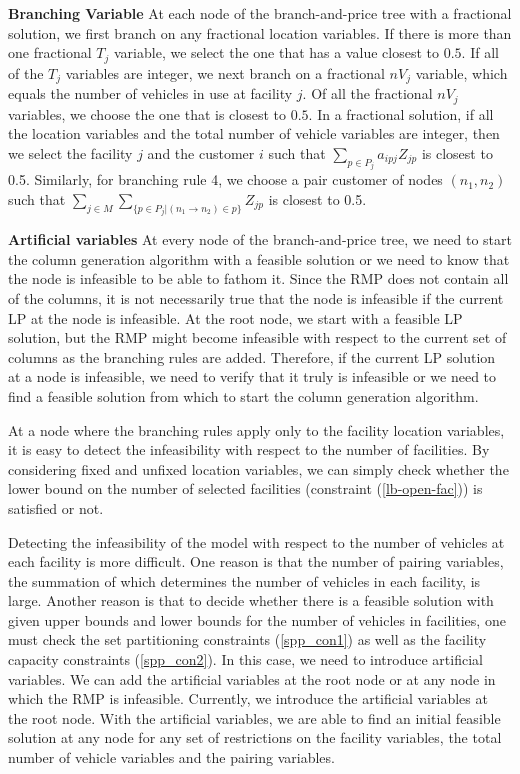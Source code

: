 {\bf Branching Variable} At each node of the branch-and-price tree with 
a fractional solution, we first branch on any fractional location variables. 
If there is more than one fractional $T_j$ variable, we select 
the one that has a value closest to $0.5$. If all of the $T_j$ variables are 
integer, we next branch on a fractional $nV_j$ variable, which equals the number 
of vehicles in use at facility $j$. Of all the fractional $nV_j$ variables, 
we choose the one that is closest to $0.5$. In a fractional solution, if all 
the location variables and the total number of vehicle variables are integer, then we 
select the facility $j$ and the customer $i$ such that 
$\sum_{p \in P_j}a_{ipj}Z_{jp} $  is closest to 0.5. Similarly, for
branching rule 4, we choose a pair customer of nodes $(n_1,n_2)$ such that   
$\sum_{j \in M}\sum_{\{p \in P_j | (n_1\to n_2) \in p\}} Z_{jp}$
is closest to 0.5. 

{\bf Artificial variables} At every node of the branch-and-price tree, we need to start 
the column generation algorithm with a feasible solution or we need to know that the 
node is infeasible to be able to fathom it. Since the RMP does not contain all of the columns,
it is not necessarily true that the node is infeasible if the current LP at the node is 
infeasible. At the root node, we start with a feasible LP solution, but the RMP might become 
infeasible with respect to the current set of columns as the branching rules are added. 
Therefore, if the current LP solution at a node is infeasible, we need to verify that it 
truly is infeasible or we need to find a feasible solution from which to start
the column generation algorithm.    

At a node where the branching rules apply only to the facility location variables, 
it is easy to detect the infeasibility with respect to the number of facilities. By 
considering fixed and unfixed location variables,  we can simply check whether the 
lower bound on the number of selected facilities (constraint (\ref{lb-open-fac})) 
is satisfied or not.

Detecting the infeasibility  of the model with respect to the number of vehicles at 
each facility is more difficult.  One reason is that the number of pairing variables, 
the summation of which determines the number of vehicles in each facility, is large.
Another reason is that to decide whether there is a feasible solution with given upper bounds and
lower bounds for the number of vehicles in facilities, one must check the set partitioning constraints
(\ref{spp_con1}) as well as the facility capacity constraints (\ref{spp_con2}). 
In this case, we need to introduce artificial 
variables. We can add the artificial variables at the root node or at any node in which the
RMP is infeasible. Currently, we introduce the artificial variables at the root node. With the artificial 
variables, we are able to 
find an initial feasible solution at any node for any set of restrictions on the 
facility variables, the total number of vehicle variables and the pairing variables.    

